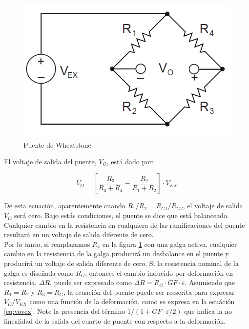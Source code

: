 \begin{figure}[!h]
\centering
\includegraphics[scale=0.45]{src/ch2/wheatstone_bridge.png}
\caption{Puente de Wheatstone}
\label{fig:wheatstone_bridge}
\end{figure}

El voltaje de salida del puente, $V_O$, está dado por:

\begin{equation}
V_O = \left[ \frac{R_3}{R_3 + R_4} - \frac{R_2}{R_1 + R_2} \right] \cdot V_{EX}
\end{equation}

De esta ecuación, aparentemente cuando $R_1/R_2 = R_{G1}/R_{G2}$, el voltaje de salida $V_O$ será cero. 
Bajo estás condiciones, el puente se dice que está balanceado. Cualquier cambio en la resistencia en 
cualquiera de las ramificaciones del puente resultará en un voltaje de salida diferente de cero. ~\cite{gageNI}\\

Por lo tanto, si remplazamos $R_4$ en la figura \ref{fig:wheatstone_bridge} con una galga activa, 
cualquier cambio en la resistencia de la galga producirá un desbalance en el puente y producirá 
un voltaje de salida diferente de cero. Si la resistencia nominal de la galga es diseñada como 
$R_G$, entonces el cambio inducido por deformación en resistencia, $\Delta R$, puede ser 
expresado como $\Delta R = R_G \cdot GF \cdot \varepsilon$. Asumiendo que $R_1 = R_2$ y 
$R_3 = R_G$, la ecuación del puente puede ser reescrita para expresar $V_O/V_{EX}$ como una 
función de la deformación, como se expresa en la ecuáción \ref{eq:vovex}. Note la presencia 
del término $1 / (1 + GF \cdot \varepsilon / 2)$ que indica la no linealidad de 
la salida del cuarto de puente con respecto a la deformación. ~\cite{gageNI} \\

